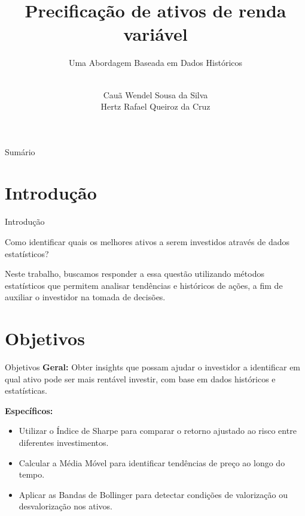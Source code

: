 \documentclass[aspectratio=169]{beamer}
\title{Precificação de ativos de renda variável}
\subtitle{Uma Abordagem Baseada em Dados Históricos}
\author{\\Cauã Wendel Sousa da Silva \\ Hertz Rafael Queiroz da Cruz}
\begin{document}
\begin{frame}
  \maketitle
\end{frame}


\begin{frame}{Sumário}
  \tableofcontents
\end{frame}

\section{Introdução}
\begin{frame}{Introdução}

  \begin{center}
    {\Large Como identificar quais os melhores ativos a serem investidos através de dados estatísticos?}

    
  \end{center}

  \vspace{0.5cm}
Neste trabalho, buscamos responder a essa questão utilizando métodos estatísticos que permitem analisar tendências e históricos de ações, a fim de auxiliar o investidor na tomada de decisões.


  
\end{frame}

\section{Objetivos}
\begin{frame}{Objetivos}
  \textbf{Geral:}  
  Obter insights que possam ajudar o investidor a identificar em qual ativo pode ser mais rentável investir, com base em dados históricos e estatísticas.

  \vspace{0.5cm}
  \textbf{Específicos:}
  \begin{itemize}
    \item Utilizar o Índice de Sharpe para comparar o retorno ajustado ao risco entre diferentes investimentos.
    \item Calcular a Média Móvel para identificar tendências de preço ao longo do tempo.
    \item Aplicar as Bandas de Bollinger para detectar condições de valorização ou desvalorização nos ativos.
  \end{itemize}
\end{frame}
\end{document}
